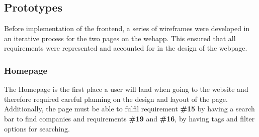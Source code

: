         \subsection{Prototypes}
        Before implementation of the frontend, a series of wireframes were developed in an iterative process for the two pages on the webapp. This ensured that all requirements were represented and accounted for in the design of the webpage. 
        
        \subsubsection{Homepage}
        \label{Homepage}
        The Homepage is the first place a user will land when going to the website and therefore required careful planning on the design and layout of the page. Additionally, the page must be able to fulfil requirement \textbf{\#15} by having a search bar to find companies and requirements \textbf{\#19} and \textbf{\#16}, by having tags and filter options for searching.
        

